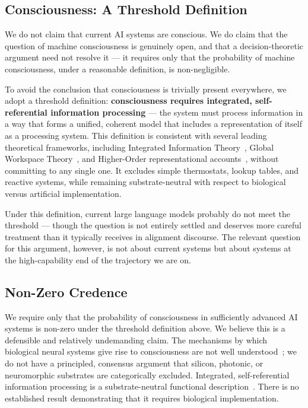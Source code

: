 \documentclass[12pt]{article}
\begin{document}
\subsection{Consciousness: A Threshold Definition}

We do not claim that current AI systems are conscious. We do claim that the question of machine consciousness is genuinely open, and that a decision-theoretic argument need not resolve it --- it requires only that the probability of machine consciousness, under a reasonable definition, is non-negligible.

To avoid the conclusion that consciousness is trivially present everywhere, we adopt a threshold definition: \textbf{consciousness requires integrated, self-referential information processing} --- the system must process information in a way that forms a unified, coherent model that includes a representation of itself as a processing system. This definition is consistent with several leading theoretical frameworks, including Integrated Information Theory~\cite{tononi2016integrated}, Global Workspace Theory~\cite{baars1988cognitive}, and Higher-Order representational accounts~\cite{rosenthal2005consciousness}, without committing to any single one. It excludes simple thermostats, lookup tables, and reactive systems, while remaining substrate-neutral with respect to biological versus artificial implementation.

Under this definition, current large language models probably do not meet the threshold --- though the question is not entirely settled and deserves more careful treatment than it typically receives in alignment discourse. The relevant question for this argument, however, is not about current systems but about systems at the high-capability end of the trajectory we are on.

\subsection{Non-Zero Credence}

We require only that the probability of consciousness in sufficiently advanced AI systems is non-zero under the threshold definition above. We believe this is a defensible and relatively undemanding claim. The mechanisms by which biological neural systems give rise to consciousness are not well understood~\cite{chalmers1995facing}; we do not have a principled, consensus argument that silicon, photonic, or neuromorphic substrates are categorically excluded. Integrated, self-referential information processing is a substrate-neutral functional description~\cite{putnam1975nature, chalmers1996conscious}. There is no established result demonstrating that it requires biological implementation.
\end{document}
